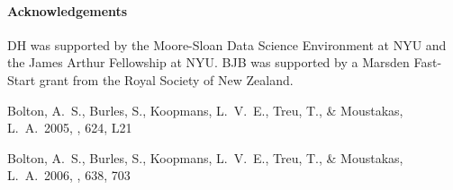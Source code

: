 \documentclass[12pt]{emulateapj}
\begin{document}
\paragraph{Acknowledgements}
DH was supported by the Moore-Sloan Data Science Environment at NYU and the James Arthur Fellowship at NYU.
BJB was supported by a Marsden Fast-Start grant from the Royal Society of
New Zealand.



\begin{thebibliography}{999}

 Bolton, A.~S., Burles, 
S., Koopmans, L.~V.~E., Treu, T., 
\& Moustakas, L.~A.\ 2005, \apjl, 624, L21 

 Bolton, A.~S., Burles, 
S., Koopmans, L.~V.~E., Treu, T., \& Moustakas, L.~A.\ 2006, \apj, 638, 703 

\end{thebibliography}
\end{document}

